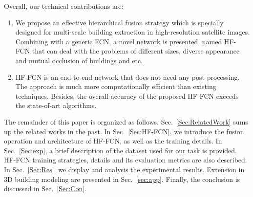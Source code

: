 Overall, our technical contributions are:
%
\begin{enumerate}
	\item We propose an effective hierarchical fusion strategy which is specially designed for multi-scale building extraction in high-resolution satellite images. Combining with a generic FCN, a novel network is presented, named HF-FCN that can deal with the problems of different sizes, diverse appearance and mutual occlusion of buildings and etc.
	\item HF-FCN is an end-to-end network that does not need any post processing. The approach is much more computationally efficient than existing techniques. Besides, the overall accuracy of the proposed HF-FCN exceeds the state-of-art algorithms.
\end{enumerate}

The remainder of this paper is organized as follows. Sec.~\ref{Sec:RelatedWork} sums up the related works in the past.
In Sec.~\ref{Sec:HF-FCN}, we introduce the fusion operation and architecture of HF-FCN, as well as the training details.
In Sec.~\ref{Sec:exp}, a brief description of the dataset used for our task is provided. HF-FCN training strategies, details and its evaluation metrics are also described.
In Sec.~\ref{Sec:Res}, we display and analysis the experimental results.
Extension in 3D building modeling are presented in Sec.~\ref{sec:app}.
Finally, the conclusion is discussed in Sec.~\ref{Sec:Con}.
